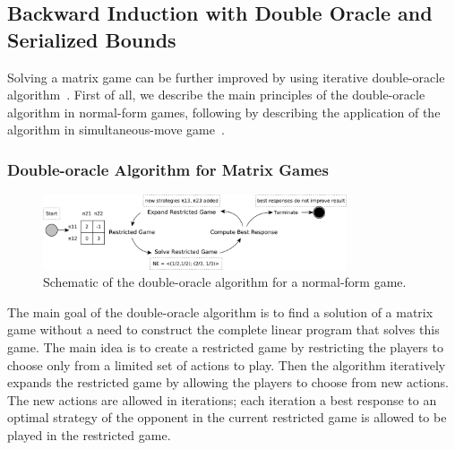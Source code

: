 \subsection{Backward Induction with Double Oracle and Serialized Bounds}\label{sec:algs:doab}
Solving a matrix game can be further improved by using iterative double-oracle algorithm~\cite{McMahan03Planning}. 
First of all, we describe the main principles of the double-oracle algorithm in normal-form games, following by describing the application of the algorithm in simultaneous-move game~\cite{Bosansky13Using}.

\subsubsection{Double-oracle Algorithm for Matrix Games}\label{sec:doab}
\begin{figure}
\centering
\includegraphics[width=0.8\textwidth]{figures/DO-scheme}
\caption{Schematic of the double-oracle algorithm for a normal-form game.}\label{fig:do-scheme}
\end{figure}

The main goal of the double-oracle algorithm is to find a solution of a matrix game without a need to construct the complete linear program that solves this game. 
The main idea is to create a restricted game by restricting the players to choose only from a limited set of actions to play.
Then the algorithm iteratively expands the restricted game by allowing the players to choose from new actions.
The new actions are allowed in iterations; each iteration a best response to an optimal strategy of the opponent in the current restricted game is allowed to be played in the restricted game.

